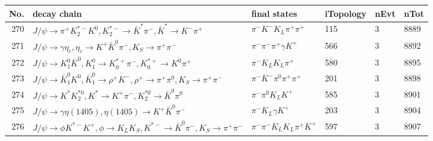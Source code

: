 \begin{table}[htbp] 
\begin{center}
\begin{small}
\begin{tabular}{rlllll}\hline\hline
 No. & decay chain & final states &  iTopology & nEvt & nTot \\\hline
270&$J/\psi       \rightarrow \pi^{+}        K_2^{*-}       K^{0}          , K_2^{*-}        \rightarrow \bar{K}^{*}   \pi^{-}        , \bar{K}^{*}    \rightarrow K^{-}          \pi^{+}        $&$\pi^{-}        K^{-}          K_{L}          \pi^{+}        \pi^{+}        $&  115&    3& 8889\\
271&$J/\psi       \rightarrow \gamma       \eta_{c}    , \eta_{c}     \rightarrow K^{+}          \bar{K}^{0}   \pi^{-}        , K_{S}           \rightarrow \pi^{+}        \pi^{-}        $&$\pi^{-}        \pi^{-}        \pi^{+}        \gamma       K^{+}          $&  566&    3& 8892\\
272&$J/\psi       \rightarrow K_1^{0}        \bar{K}^{0}   , K_1^{0}         \rightarrow K_{0}^{*+}     \pi^{-}        , K_{0}^{*+}      \rightarrow K^{0}          \pi^{+}        $&$\pi^{-}        K_{L}          K_{L}          \pi^{+}        $&  580&    3& 8895\\
273&$J/\psi       \rightarrow \bar{K}_1^{0} K^{0}          , \bar{K}_1^{0}  \rightarrow \rho^{+}      K^{-}          , \rho^{+}       \rightarrow \pi^{+}        \pi^{0}        , K_{S}           \rightarrow \pi^{+}        \pi^{-}        $&$\pi^{-}        K^{-}          \pi^{0}        \pi^{+}        \pi^{+}        $&  201&    3& 8898\\
274&$J/\psi       \rightarrow K^{*}          K_2^{*0}       , K^{*}           \rightarrow K^{+}          \pi^{-}        , K_2^{*0}        \rightarrow \bar{K}^{0}   \pi^{0}        $&$\pi^{-}        \pi^{0}        K_{L}          K^{+}          $&  585&    3& 8901\\
275&$J/\psi       \rightarrow \gamma       \eta(1405)    , \eta(1405)     \rightarrow K^{+}          \bar{K}^{0}   \pi^{-}        $&$\pi^{-}        K_{L}          \gamma       K^{+}          $&  203&    3& 8904\\
276&$J/\psi       \rightarrow \phi           K^{*-}         K^{+}          , \phi            \rightarrow K_{L}          K_{S}          , K^{*-}          \rightarrow \bar{K}^{0}   \pi^{-}        , K_{S}           \rightarrow \pi^{+}        \pi^{-}        $&$\pi^{-}        \pi^{-}        K_{L}          K_{L}          \pi^{+}        K^{+}          $&  597&    3& 8907\\

\end{tabular}
\end{small}
\end{center}
\end{table}
